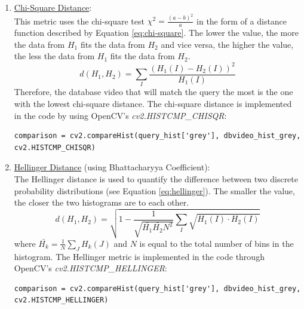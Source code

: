 \begin{enumerate}
    \item \underline{Chi-Square Distance}:\\ 
    This metric uses the chi-square test $\chi^2=\frac{(a-b)^2}{a}$ in the form of a distance function described by Equation \ref{eq:chi-square}. The lower the value, the more the data from $H_1$ fits the data from $H_2$ and vice versa, the higher the value, the less the data from $H_1$ fits the data from $H_2$.
    \begin{equation}
    \label{eq:chi-square}
        d(H_1,H_2)=\sum_I\frac{(H_1(I)-H_2(I))^2}{H_1(I)}
    \end{equation}
    Therefore, the database video that will match the query the most is the one with the lowest chi-square distance. The chi-square distance is implemented in the code by using OpenCV's \textit{cv2.HISTCMP\_CHISQR}:
\begin{lstlisting}[numbers=none]
comparison = cv2.compareHist(query_hist['grey'], dbvideo_hist_grey, cv2.HISTCMP_CHISQR)
\end{lstlisting}

    
    \item \underline{Hellinger Distance} (using Bhattacharyya Coefficient):\\
    The Hellinger distance is used to quantify the difference between two discrete probability distributions (see Equation \ref{eq:hellinger}). The smaller the value, the closer the two histograms are to each other.
    \begin{equation}
    \label{eq:hellinger}
        d(H_1,H_2)=\sqrt{1-\frac{1}{\sqrt{\bar{H_1}\bar{H_2}N^2}}\sum_I\sqrt{H_1(I)\cdot H_2(I)}}
    \end{equation}
    where $\bar{H_k}=\frac{1}{N}\sum_JH_k(J)$ and $N$ is equal to the total number of bins in the histogram. The Hellinger metric is implemented in the code through OpenCV's \textit{cv2.HISTCMP\_HELLINGER}:
\begin{lstlisting}[numbers=none]
comparison = cv2.compareHist(query_hist['grey'], dbvideo_hist_grey, cv2.HISTCMP_HELLINGER)
\end{lstlisting}


\end{enumerate}
